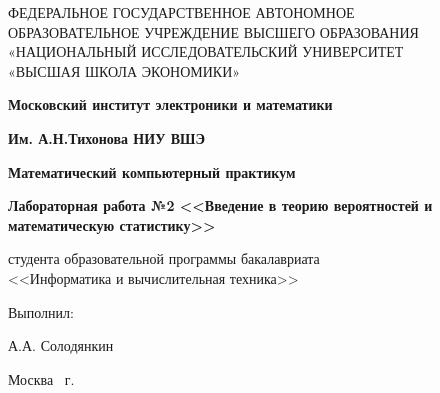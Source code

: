 \begin{titlepage}
	\begin{center}
		ФЕДЕРАЛЬНОЕ  ГОСУДАРСТВЕННОЕ АВТОНОМНОЕ \\
		ОБРАЗОВАТЕЛЬНОЕ УЧРЕЖДЕНИЕ ВЫСШЕГО ОБРАЗОВАНИЯ\\
		«НАЦИОНАЛЬНЫЙ ИССЛЕДОВАТЕЛЬСКИЙ УНИВЕРСИТЕТ\\
		«ВЫСШАЯ ШКОЛА ЭКОНОМИКИ»
	\end{center}
	
	\begin{center}
		\textbf{Московский институт электроники и математики}
		
		\textbf{Им. А.Н.Тихонова НИУ ВШЭ}
	\end{center}
	\vspace{1ex}	
	
	\vspace{1ex}
	\begin{center}
		\textbf{Математический компьютерный практикум}
	\end{center}	

\begin{center}
	\textbf{Лабораторная работа №2 <<Введение в теорию вероятностей и математическую статистику>>}
\end{center}
	\vspace{2ex}
	\begin{center}
		студента образовательной программы бакалавриата \\
		<<Информатика и вычислительная техника>> \\
		
	\end{center}
	\vspace{3ex}
	\begin{flushright}
		Выполнил: 
		
		\vspace{1ex}
		
		\vspace{2ex}
		А.А. Солодянкин 
	\end{flushright}

	\vfill
	\begin{center}
		Москва \the\year \, г.
	\end{center}
\end{titlepage}